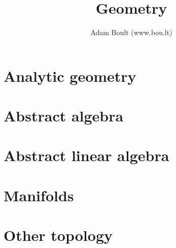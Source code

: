 \documentclass[oneside]{book}
\begin{document}
\author{Adam Boult (www.bou.lt)}
\title{Geometry}
\maketitle

\setcounter{tocdepth}{0}
\tableofcontents



\part{Analytic geometry}







\part{Abstract algebra}




\part{Abstract linear algebra}









\part{Manifolds}







\part{Other topology}




\end{document}
